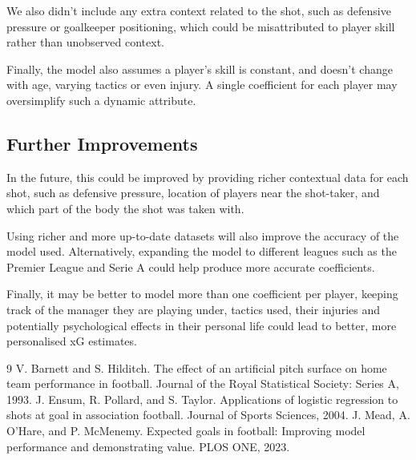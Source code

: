 \documentclass{article}
\begin{document}
We also didn't include any extra context related to the shot, such as defensive pressure or goalkeeper positioning, which could be misattributed to player skill rather than unobserved context.

Finally, the model also assumes a player's skill is constant, and doesn't change with age, varying tactics or even injury. A single coefficient for each player may oversimplify such a dynamic attribute.

\subsection{Further Improvements}
In the future, this could be improved by providing richer contextual data for each shot, such as defensive pressure, location of players near the shot-taker, and which part of the body the shot was taken with.

Using richer and more up-to-date datasets will also improve the accuracy of the model used. Alternatively, expanding the model to different leagues such as the Premier League and Serie A could help produce more accurate coefficients.

Finally, it may be better to model more than one coefficient per player, keeping track of the manager they are playing under, tactics used, their injuries and potentially psychological effects in their personal life could lead to better, more personalised xG estimates.


\begin{thebibliography}{9}
V. Barnett and S. Hilditch.
\newblock The effect of an artificial pitch surface on home team performance in football.
\newblock Journal of the Royal Statistical Society: Series A, 1993.
J. Ensum, R. Pollard, and S. Taylor.
\newblock Applications of logistic regression to shots at goal in association football.
\newblock Journal of Sports Sciences, 2004.
J. Mead, A. O’Hare, and P. McMenemy.
\newblock Expected goals in football: Improving model performance and demonstrating value.
\newblock PLOS ONE, 2023.
\end{thebibliography}
\end{document}
